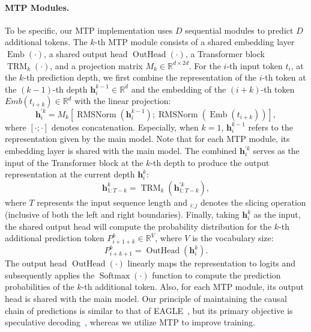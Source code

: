 \paragraph{MTP Modules.}
To be specific, our MTP implementation uses $D$ sequential modules to predict $D$ additional tokens. 
The $k$-th MTP module consists of a shared embedding layer $\operatorname{Emb}(\cdot)$, a shared output head $\operatorname{OutHead}(\cdot)$, a Transformer block $\operatorname{TRM}_k(\cdot)$, and a projection matrix $M_k \in \mathbb{R}^{d \times 2d}$. 
For the $i$-th input token $t_i$, at the $k$-th prediction depth, we first combine the representation of the $i$-th token at the $(k-1)$-th depth $\mathbf{h}_i^{k-1} \in \mathbb{R}^{d}$ and the embedding of the $(i+k)$-th token $Emb(t_{i+k}) \in \mathbb{R}^{d}$ with the linear projection: 
\begin{equation}
    \mathbf{h}_i^{\prime k} = M_k [\operatorname{RMSNorm}(\mathbf{h}_i^{k-1}) ; \operatorname{RMSNorm}(\operatorname{Emb}(t_{i+k}))],
\end{equation}
where $[\cdot ; \cdot]$ denotes concatenation. 
Especially, when $k=1$, $\mathbf{h}_i^{k-1}$ refers to the representation given by the main model.
Note that for each MTP module, its embedding layer is shared with the main model. 
The combined $\mathbf{h}_i^{\prime k}$ serves as the input of the Transformer block at the $k$-th depth to produce the output representation at the current depth $\mathbf{h}_{i}^{k}$:
\begin{equation}
    \mathbf{h}_{1:T-k}^{k} = \operatorname{TRM}_k(\mathbf{h}_{1:T-k}^{\prime k}),
\end{equation}
where $T$ represents the input sequence length and $_{i:j}$ denotes the slicing operation (inclusive of both the left and right boundaries). 
Finally, taking $\mathbf{h}_{i}^{k}$ as the input, the shared output head will compute the probability distribution for the $k$-th additional prediction token $P_{i+1+k}^{k} \in \mathbb{R}^{V}$, where $V$ is the vocabulary size:
\begin{equation}
    P_{i+k+1}^{k} = \operatorname{OutHead}(\mathbf{h}_{i}^{k}).
\end{equation}
The output head $\operatorname{OutHead}(\cdot)$ linearly maps the representation to logits and subsequently applies the $\operatorname{Softmax}(\cdot)$ function to compute the prediction probabilities of the $k$-th additional token. 
Also, for each MTP module, its output head is shared with the main model. 
Our principle of maintaining the causal chain of predictions is similar to that of EAGLE~\citep{eagle}, but its primary objective is speculative decoding~\citep{speculative_xhm,speculative_google}, whereas we utilize MTP to improve training.


